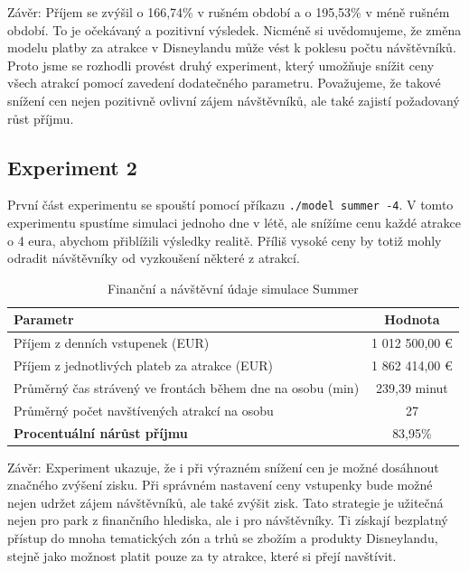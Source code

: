 \documentclass[a4paper,12pt]{article}
\begin{document}
Závěr: Příjem se zvýšil o 166,74\% v rušném období a o 195,53\%  v méně rušném období. To je očekávaný a pozitivní výsledek. Nicméně si uvědomujeme, že změna modelu platby za atrakce v Disneylandu může vést k poklesu počtu návštěvníků. Proto jsme se rozhodli provést druhý experiment, který umožňuje snížit ceny všech atrakcí pomocí zavedení dodatečného parametru. Považujeme, že takové snížení cen nejen pozitivně ovlivní zájem návštěvníků, ale také zajistí požadovaný růst příjmu.

\subsection{Experiment 2}
První část experimentu se spouští pomocí příkazu \texttt{./model summer -4}. V tomto experimentu spustíme simulaci jednoho dne v létě, ale snížíme cenu každé atrakce o 4 eura, abychom přiblížili výsledky realitě. Příliš vysoké ceny by totiž mohly odradit návštěvníky od vyzkoušení některé z atrakcí.

\begin{table}[h!]
	\centering
	\caption{Finanční a návštěvní údaje simulace Summer}
	\label{tab:financial_and_visit_data}
	\begin{tabular}{|l|c|}
		\hline
		\textbf{Parametr}                                         & \textbf{Hodnota} \\ \hline
		Příjem z denních vstupenek (EUR)                          & 1 012 500,00 €   \\ \hline
		Příjem z jednotlivých plateb za atrakce (EUR)             & 1 862 414,00 €   \\ \hline
		Průměrný čas strávený ve frontách během dne na osobu (min) & 239,39 minut     \\ \hline
		Průměrný počet navštívených atrakcí na osobu             & 27               \\ \hline
		\textbf{Procentuální nárůst příjmu}                       & 83,95\%         \\ \hline
	\end{tabular}
\end{table}

Závěr: Experiment ukazuje, že i při výrazném snížení cen je možné dosáhnout značného zvýšení zisku. Při správném nastavení ceny vstupenky bude možné nejen udržet zájem návštěvníků, ale také zvýšit zisk. Tato strategie je užitečná nejen pro park z finančního hlediska, ale i pro návštěvníky. Ti získají bezplatný přístup do mnoha tematických zón a trhů se zbožím a produkty Disneylandu, stejně jako možnost platit pouze za ty atrakce, které si přejí navštívit.
\end{document}
